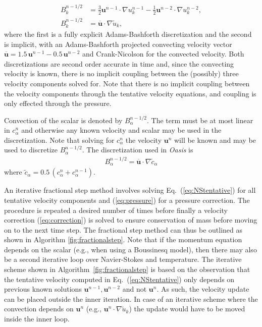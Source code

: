 \documentclass[final,3p,times,twocolumn]{elsarticle}
\newcounter{bla}
\begin{document}
\begin{align}
  B_{k}^{n-1/2} &= \frac{3}{2} \bm{u}^{n-1} \cdot \nabla u_k^{n-1} - \frac{1}{2} \bm{u}^{n-2} \cdot \nabla u_k^{n-2}, \label{eq:convection_ABE}\\
  B_{k}^{n-1/2} &= \overline{\bm{u}} \cdot \nabla \tilde{u}_k, \label{eq:convection_ABCN}
\end{align}
where the first is a fully explicit Adams-Bashforth discretization and the second is implicit, with an Adams-Bashforth projected convecting velocity vector $\overline{\bm{u}} = 1.5\, \bm{u}^{n-1} - 0.5\, \bm{u}^{n-2}$ and Crank-Nicolson for the convected velocity. Both discretizations are second order accurate in time and, since the convecting velocity is known,  there is no implicit coupling between the (possibly) three velocity components solved for. Note that there is no implicit coupling between the velocity components through the tentative velocity equations, and coupling is only effected through the pressure. 

Convection of the scalar is denoted by $B_{\alpha}^{n-1/2}$. The term must be at most linear in $c_{\alpha}^n$ and otherwise any known velocity and scalar may be used in the discretization. Note that solving for $c_{\alpha}^n$ the velocity $\bm{u}^n$ will be known and may be used to discretize $B_{\alpha}^{n-1/2}$. The discretization used in \emph{Oasis} is
\begin{align*}
  B_{\alpha}^{n-1/2} = \overline{\bm{u}} \cdot \nabla \tilde{c}_{\alpha}
\end{align*}
where $\tilde{c}_{\alpha} = 0.5\,(c_{\alpha}^n+c_{\alpha}^{n-1})$.

An iterative fractional step method involves solving Eq.~(\ref{eq:NStentative}) for all tentative velocity components and (\ref{eq:pressure}) for a pressure correction. The procedure is repeated a desired number of times before finally a velocity correction (\ref{eq:correction}) is solved to ensure conservation of mass before moving on to the next time step. The fractional step method can thus be outlined as shown in Algorithm \ref{fig:fractionalstep}. Note that if the momentum equation depends on the scalar (e.g., when using a Boussinesq model), then there may also be a second iterative loop over Navier-Stokes and temperature. The iterative scheme shown in Algorithm~\ref{fig:fractionalstep} is based on the observation that the tentative velocity computed in Eq.~(\ref{eq:NStentative}) only depends on previous known solutions $\bm{u}^{n-1}, \bm{u}^{n-2} $ and not $\bm{u}^n$. As such, the velocity update can be placed outside the inner iteration. In case of an iterative scheme where the convection depends on $\bm{u}^n$ (e.g., $\bm{u}^n\cdot \nabla \tilde{u}_k$) the update would have to be moved inside the inner loop.
\end{document}
